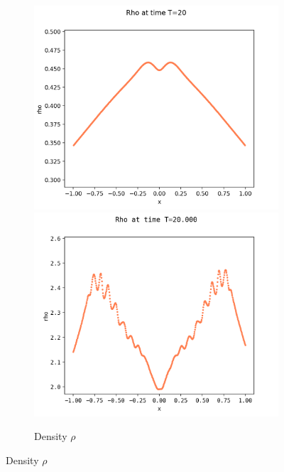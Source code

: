\documentclass{article}
\numberwithin{equation}{section}
\newcommand{\imh}{\textheight} %
\newcommand{\imw}{\textwidth} %
\begin{document}
\begin{figure}
	\begin{subfigure}{\textwidth}
		\centering
		\includegraphics[height=\imh,width=\imw]{images/rhoT20_FD.png}
		\includegraphics[height=\imh,width=\imw]{images/rhoT20_512.png}
		\caption{Density $\rho$}
		\label{subfig:compT02_rho}
	\end{subfigure}
	

\end{figure}
\end{document}
